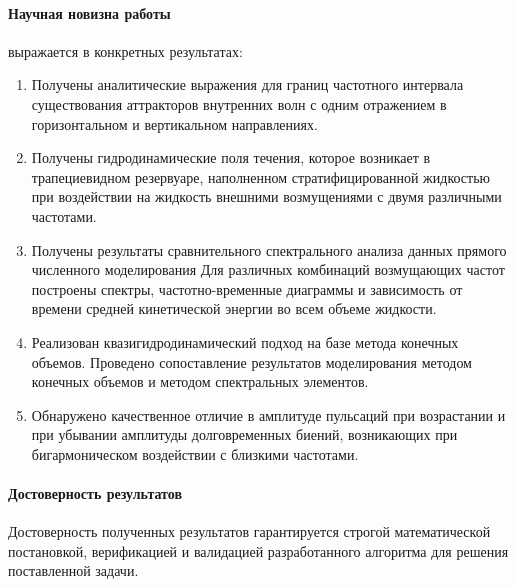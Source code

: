 \documentclass[utf8x]{G7-32} %
\begin{document}
\paragraph{Научная новизна работы} выражается в конкретных результатах:
\begin{enumerate}[1.]
  \item Получены аналитические выражения для границ частотного интервала существования аттракторов внутренних волн с одним отражением в горизонтальном и вертикальном направлениях.%
    
  \item Получены гидродинамические поля течения, которое возникает в трапециевидном резервуаре, наполненном стратифицированной жидкостью при воздействии на жидкость внешними возмущениями с двумя различными частотами. 
    
  \item 
  Получены результаты сравнительного спектрального анализа
  данных прямого численного моделирования
  Для различных комбинаций возмущающих частот построены спектры, частотно-временные диаграммы и зависимость от времени средней кинетической энергии во всем объеме жидкости. 
    
  \item Реализован квазигидродинамический подход на базе метода конечных объемов. Проведено сопоставление результатов моделирования методом конечных объемов и методом спектральных элементов.

  \item Обнаружено качественное отличие в амплитуде пульсаций при возрастании и при убывании амплитуды долговременных биений, возникающих при бигармоническом воздействии с близкими частотами.

\end{enumerate}

\paragraph{Достоверность результатов}

Достоверность полученных результатов гарантируется строгой математической постановкой, верификацией и валидацией разработанного алгоритма для решения поставленной задачи.

\end{document}

